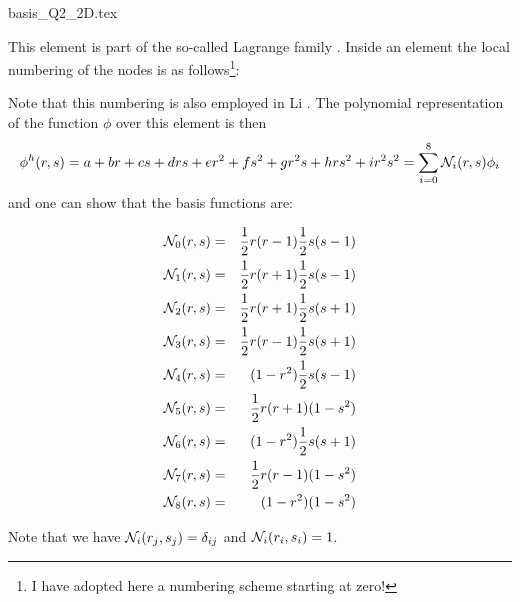 \begin{flushright} {\tiny {\color{gray} basis\_Q2\_2D.tex}} \end{flushright}

This element is part of the so-called Lagrange family \cite{raki00}. 
Inside an element the local numbering of the nodes is as follows\footnote{I have adopted here 
a numbering scheme starting at zero!}:



Note that this numbering is also employed in Li \cite[p56]{li06}.
The polynomial representation of the function $\phi$ over this element is then
\[
\phi^h(r,s) = a + br + cs + drs + er^2 + fs^2 + gr^2s + hrs^2 + i r^2s^2 = \sum_{i=0}^8 {\mathcal{N}}_i(r,s) \phi_i
\]
and one can show that the basis functions are:
\begin{mdframed}[backgroundcolor=blue!5]
\begin{eqnarray}
{\mathcal{N}}_0(r,s)&=& \frac{1}{2}r(r-1)  \frac{1}{2}s(s-1)\nonumber\\
{\mathcal{N}}_1(r,s)&=& \frac{1}{2}r(r+1)  \frac{1}{2}s(s-1)\nonumber\\
{\mathcal{N}}_2(r,s)&=& \frac{1}{2}r(r+1)  \frac{1}{2}s(s+1)\nonumber\\
{\mathcal{N}}_3(r,s)&=& \frac{1}{2}r(r-1)  \frac{1}{2}s(s+1)\nonumber\\
{\mathcal{N}}_4(r,s)&=&     (1-r^2)  \frac{1}{2}s(s-1)\nonumber\\
{\mathcal{N}}_5(r,s)&=& \frac{1}{2}r(r+1)      (1-s^2)\nonumber\\
{\mathcal{N}}_6(r,s)&=&     (1-r^2)  \frac{1}{2}s(s+1)\nonumber\\
{\mathcal{N}}_7(r,s)&=& \frac{1}{2}r(r-1)      (1-s^2)\nonumber\\
{\mathcal{N}}_8(r,s)&=&     (1-r^2)      (1-s^2)\nonumber
\end{eqnarray}
\end{mdframed}

Note that we have ${\mathcal{N}}_i(r_j,s_j)=\delta_{ij}$ and ${\mathcal{N}}_i(r_i,s_i)=1$. 

